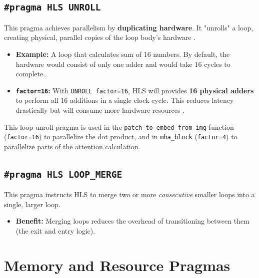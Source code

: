 \subsection{\texttt{\#pragma HLS UNROLL}}
This pragma achieves parallelism by \textbf{duplicating hardware}. It "unrolls" a loop, creating physical, parallel copies of the loop body's hardware \cite{ref10, ref13}.
\begin{itemize}
    \item \textbf{Example:} A loop that calculates sum of 16 numbers. By default, the hardware would consist of only one adder and would take 16 cycles to complete..
    \item \textbf{\texttt{factor=16}:} With \texttt{UNROLL factor=16}, HLS will provides \textbf{16 physical adders} to perform all 16 additions in a single clock cycle. This reduces latency drastically but will consume more hardware resources \cite{ref15, ref16}.
\end{itemize}
This loop unroll pragma is used in the \texttt{patch\_to\_embed\_from\_img} function (\texttt{factor=16}) to parallelize the dot product, and in \texttt{mha\_block} (\texttt{factor=4}) to parallelize parts of the attention calculation.

\subsection{\texttt{\#pragma HLS LOOP\_MERGE}}
This pragma instructs HLS to merge two or more \textit{consecutive} smaller loops  into a single, larger loop.
\begin{itemize}
    \item \textbf{Benefit:} Merging loops reduces the overhead of transitioning between them (the exit and entry logic).
\end{itemize}

\section{Memory and Resource Pragmas}

